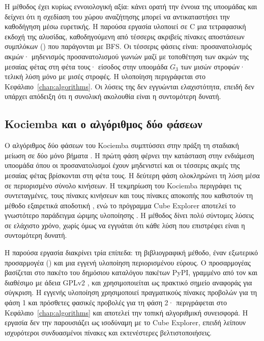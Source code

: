 Η μέθοδος έχει κυρίως εννοιολογική αξία: κάνει ορατή την έννοια της υποομάδας και δείχνει ότι η σχεδίαση του χώρου αναζήτησης μπορεί να αντικαταστήσει την καθοδήγηση μέσω ευρετικής. Η παρούσα εργασία υλοποιεί σε C μια τετραφασική εκδοχή της αλυσίδας, καθοδηγούμενη από τέσσερις ακριβείς πίνακες αποστάσεων συμπλόκων () που παράγονται με BFS. Οι τέσσερις φάσεις είναι: προσανατολισμός ακμών· μηδενισμός προσανατολισμού γωνιών μαζί με τοποθέτηση των ακμών της μεσαίας φέτας στη φέτα τους· είσοδος στην υποομάδα \(G_3\) των μισών στροφών· τελική λύση μόνο με μισές στροφές. Η υλοποίηση περιγράφεται στο Κεφάλαιο~\ref{chap:algorithms}. Οι λύσεις της δεν εγγυώνται ελαχιστότητα, επειδή δεν υπάρχει απόδειξη ότι η συνολική ακολουθία είναι η συντομότερη δυνατή.

\subsection{Kociemba και ο αλγόριθμος δύο φάσεων}
\label{sec:background-kociemba}

Ο αλγόριθμος δύο φάσεων του Kociemba συμπτύσσει στην πράξη τη σταδιακή μείωση σε δύο μόνο βήματα \cite{kociembaTwoPhase}. Η πρώτη φάση φέρνει την κατάσταση στην ενδιάμεση υποομάδα όπου οι προσανατολισμοί έχουν μηδενιστεί και οι τέσσερις ακμές της μεσαίας φέτας βρίσκονται στη φέτα τους. Η δεύτερη φάση ολοκληρώνει τη λύση μέσα σε περιορισμένο σύνολο κινήσεων. Η τεκμηρίωση του Kociemba περιγράφει τις συντεταγμένες, τους πίνακες κινήσεων και τους πίνακες αποκοπής που καθιστούν τη μέθοδο εξαιρετικά αποδοτική \cite{kociembaImplementationDetails}, ενώ το πρόγραμμα Cube Explorer αποτελεί το γνωστότερο παράδειγμα ώριμης υλοποίησης \cite{kociembaCubeExplorer}. Η μέθοδος δίνει πολύ σύντομες λύσεις σε ελάχιστο χρόνο, χωρίς όμως να εγγυάται ότι κάθε λύση που επιστρέφει είναι η συντομότερη δυνατή.

Η παρούσα εργασία διακρίνει τρία επίπεδα: τη βιβλιογραφική μέθοδο, έναν εξωτερικό προσαρμογέα () και μια εγγενή υλοποίηση περιορισμένου εύρους. Ο προσαρμογέας βασίζεται στο πακέτο  του δημόσιου καταλόγου πακέτων PyPI, γραμμένο από τον  και διαθέσιμο με άδεια GPLv2 \cite{muodovKociembaPkg}, και χρησιμοποιείται ως πρακτικό σημείο αναφοράς για σύγκριση. Η εγγενής υλοποίηση χρησιμοποιεί πραγματικούς πίνακες προβολών για τη φάση 1 και πρόσθετες φασικές προβολές για τη φάση 2· περιγράφεται στο Κεφάλαιο~\ref{chap:algorithms} και αποτελεί την τοπική αλγοριθμική συνεισφορά. Η εργασία δεν την παρουσιάζει ως ισοδύναμη με το Cube Explorer, επειδή λείπουν ισχυρότεροι συνδυασμένοι πίνακες και εκτενέστερες βελτιστοποιήσεις.

